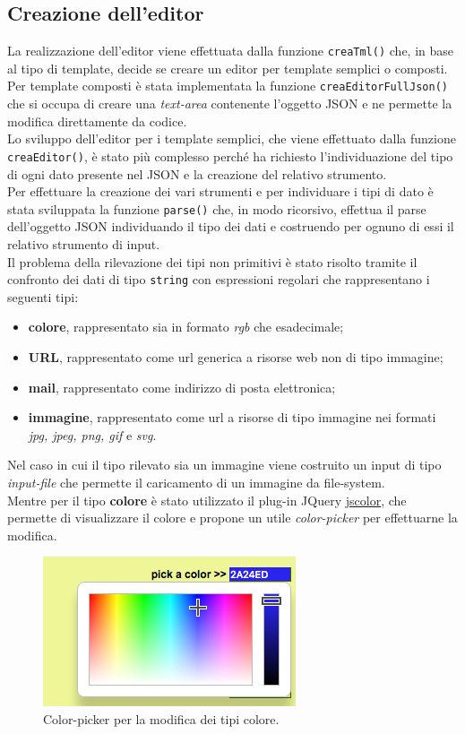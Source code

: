 \subsection{Creazione dell'editor}
La realizzazione dell'editor viene effettuata dalla funzione \texttt{creaTml()} che, in base al tipo di template, decide se creare un editor per template semplici o composti.\\
Per template composti è stata implementata la funzione \texttt{creaEditorFullJson()} che si occupa di creare una \textit{text-area} contenente l'oggetto JSON e ne permette la modifica direttamente da codice.\\
Lo sviluppo dell'editor per i template semplici, che viene effettuato dalla funzione \texttt{creaEditor()}, è stato più complesso perché ha richiesto l'individuazione del tipo di ogni dato presente nel JSON e la creazione del relativo strumento.\\
Per effettuare la creazione dei vari strumenti e per individuare i tipi di dato è stata sviluppata la funzione \texttt{parse()} che, in modo ricorsivo, effettua il parse dell'oggetto JSON individuando il tipo dei dati e costruendo per ognuno di essi il relativo strumento di input.\\
Il problema della rilevazione dei tipi non primitivi è stato risolto tramite il confronto dei dati di tipo \texttt{string} con espressioni regolari che rappresentano i seguenti tipi:
\begin{itemize}
	\item \textbf{colore}, rappresentato sia in formato \textit{rgb} che esadecimale;
	\item \textbf{URL}, rappresentato come url generica a risorse web non di tipo immagine;
	\item \textbf{mail}, rappresentato come indirizzo di posta elettronica;
	\item \textbf{immagine}, rappresentato come url a risorse di tipo immagine nei formati \textit{jpg, jpeg, png, gif} e \textit{svg}.
\end{itemize}
Nel caso in cui il tipo rilevato sia un immagine viene costruito un input di tipo \textit{input-file} che permette il caricamento di un immagine da file-system.\\
Mentre per il tipo \textbf{colore} è stato utilizzato il plug-in JQuery \href{http://jscolor.com/}{jscolor}, che permette di visualizzare il colore e propone un utile \textit{color-picker} per effettuarne la modifica.\\
\begin{figure}[htp]
	\centering
	\includegraphics[scale=1]{../immagini/color_picker}
	\caption{Color-picker per la modifica dei tipi colore.}
\end{figure}
